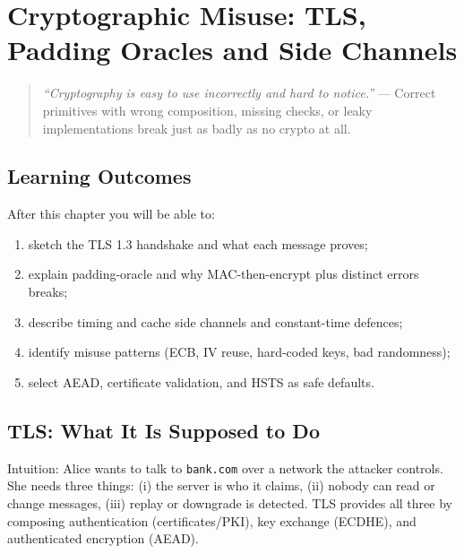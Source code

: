 \chapter{Cryptographic Misuse: TLS, Padding Oracles and Side Channels}
\label{ch:crypto-misuse}

\begin{quote}
\emph{``Cryptography is easy to use incorrectly and hard to notice.''} --- Correct primitives with wrong composition, missing checks, or leaky implementations break just as badly as no crypto at all.
\end{quote}

\noindent{}
\vspace{0.4em}

\section*{Learning Outcomes}
After this chapter you will be able to:
\begin{enumerate}[label=(L\arabic*)]
    \item sketch the TLS 1.3 handshake and what each message proves;
    \item explain padding-oracle and why MAC-then-encrypt plus distinct errors breaks;
    \item describe timing and cache side channels and constant-time defences;
    \item identify misuse patterns (ECB, IV reuse, hard-coded keys, bad randomness);
    \item select AEAD, certificate validation, and HSTS as safe defaults.
\end{enumerate}

\section{TLS: What It Is Supposed to Do}
\label{sec:tls}
Intuition: Alice wants to talk to \texttt{bank.com} over a network the attacker controls. She needs three things: (i) the server is who it claims, (ii) nobody can read or change messages, (iii) replay or downgrade is detected. TLS provides all three by composing authentication (certificates/PKI), key exchange (ECDHE), and authenticated encryption (AEAD).

